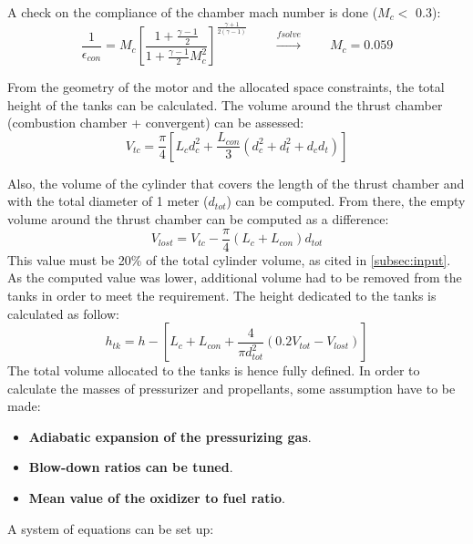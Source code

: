A check on the compliance of the chamber mach number is done ($M_c <$ 0.3):
\begin{equation}    
    \frac{1}{\epsilon_{con}} = M_c \left[ \frac{1 + \frac{\gamma - 1}{2}}{1 + \frac{\gamma - 1}{2} M_c^2} \right]^{\frac{\gamma + 1}{2(\gamma - 1)}}
    \qquad \xrightarrow{\textit{fsolve}} \qquad M_c = 0.059
\end{equation}

From the geometry of the motor and the allocated space constraints, the total height of the tanks can be calculated. The volume around the thrust chamber (combustion chamber + convergent) can be assessed:
\begin{equation}
    V_{tc} = \frac{\pi}{4} \left[L_c d_c^2  + \frac{L_{con}}{3} \left(d_c^2 + d_t^2 + d_c d_t\right)\right]
    \label{eq:v_tc}
\end{equation}

Also, the volume of the cylinder that covers the length of the thrust chamber and with the total diameter of 1 meter ($d_{tot}$) can be computed. From there, the empty volume around the thrust chamber can be computed as a difference:
\begin{equation}
    V_{lost} =  V_{tc} - \frac{\pi}{4} \left(L_{c} + L_{con}\right) d_{tot}
\end{equation}
This value must be 20\% of the total cylinder volume, as cited in \autoref{subsec:input}. As the computed value was lower, additional volume had to be removed from the tanks in order to meet the requirement. The height dedicated to the tanks is calculated as follow:
\begin{equation}
    h_{tk} =  h - \left[L_{c} + L_{con} + \frac{4}{\pi d_{tot}^2}\left( 0.2 V_{tot} - V_{lost}\right) \right]
\end{equation}
The total volume allocated to the tanks is hence fully defined. 
In order to calculate the masses of pressurizer and propellants, some assumption have to be made:
\begin{itemize}
    \item \textbf{Adiabatic expansion of the pressurizing gas}.
    \item \textbf{Blow-down ratios can be tuned}.
    \item \textbf{Mean value of the oxidizer to fuel ratio}.
\end{itemize}

A system of equations can be set up:

